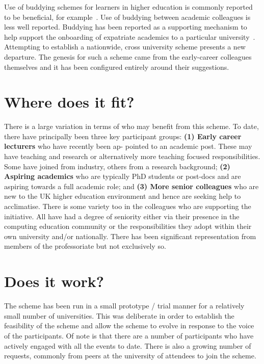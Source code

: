 \documentclass[sigconf]{acmart}
\begin{document}
Use of buddying schemes for learners in higher education is commonly
reported to be beneficial, for example~\cite{Hayes2020,May20}. Use of
buddying between academic colleagues is less well reported. Buddying
has been reported as a supporting mechanism to help support the
onboarding of expatriate academics to a particular
university~\cite{Wilkins2019}. Attempting to establish a nationwide,
cross university scheme presents a new departure. The genesis for such
a scheme came from the early-career colleagues themselves and it has
been configured entirely around their suggestions.
	
\section{Where does it fit?}

There is a large variation in terms of who may benefit from this
scheme. To date, there have principally been three key participant
groups: \textbf{(1) Early career lecturers} who have recently been ap-
pointed to an academic post. These may have teaching and research or
alternatively more teaching focused responsibilities. Some have joined
from industry, others from a research background; \textbf{(2) Aspiring
academics }who are typically PhD students or post-docs and are
aspiring towards a full academic role; and \textbf{ (3) More senior
colleagues} who are new to the UK higher education environment and
hence are seeking help to acclimatise. There is some variety too in
the colleagues who are supporting the initiative. All have had a
degree of seniority either via their presence in the computing
education community or the responsibilities they adopt within their
own university and/or nationally. There has been significant
representation from members of the professoriate but not exclusively
so.

\section{Does it work?}	
\label{Sec:DoesItWork}
The scheme has been run in a small prototype / trial manner for a
relatively small number of universities. This was deliberate in order
to establish the feasibility of the scheme and allow the scheme to
evolve in response to the voice of the participants. Of note is that
there are a number of participants who have actively engaged with all
the events to date. There is also a growing number of requests,
commonly from peers at the university of attendees to join the scheme.
\end{document}
